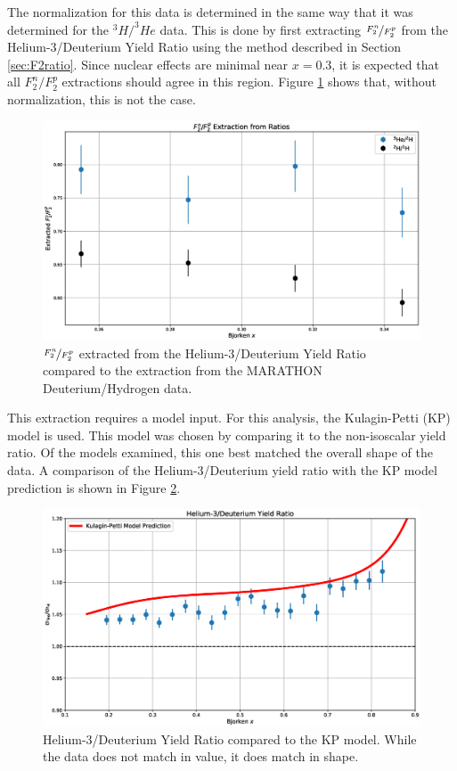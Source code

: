 The normalization for this data is determined in the same way that it was determined for the $^3H/^3He$ data. This is done by first extracting $\nicefrac{F_2^n}{F_2^p}$ from the Helium-3/Deuterium Yield Ratio using the method described in Section \ref{sec:F2ratio}. Since nuclear effects are minimal near $x=0.3$, it is expected that all $F_2^n/F_2^p$ extractions should agree in this region. Figure \ref{fig:f2r} shows that, without normalization, this is not the case.

\begin{figure}[p]
	\includegraphics[width=\textwidth]{./results/fig/f2r.eps}
	\caption{$\nicefrac{F_2^n}{F_2^p}$ extracted from the Helium-3/Deuterium Yield Ratio compared to the extraction from the MARATHON Deuterium/Hydrogen data.}
	\label{fig:f2r}
\end{figure}

This extraction requires a model input. For this analysis, the Kulagin-Petti (KP) model is used. This model was chosen by comparing it to the non-isoscalar yield ratio. Of the models examined, this one best matched the overall shape of the data. A comparison of the Helium-3/Deuterium yield ratio with the KP model prediction is shown in Figure \ref{fig:KP_comp}.

\begin{figure}[p]
	\includegraphics[width=\textwidth]{./results/fig/KPcomp.eps}
	\caption{Helium-3/Deuterium Yield Ratio compared to the KP model. While the data does not match in value, it does match in shape.}
	\label{fig:KP_comp}
\end{figure}

